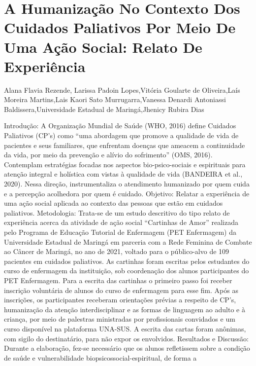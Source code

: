 
\section*{A Humanização No Contexto Dos Cuidados Paliativos Por Meio De Uma Ação Social: Relato De Experiência}

Alana Flavia Rezende, Larissa Padoin Lopes,Vitória Goularte de Oliveira,Laís Moreira Martins,Lais Kaori Sato Murrugarra,Vanessa Denardi Antoniassi Baldissera,Universidade Estadual de Maringá,Jhenicy Rubira Dias

Introdução: A Organização Mundial de Saúde (WHO, 2016) define Cuidados Paliativos (CP’s)
como “uma abordagem que promove a qualidade de vida de pacientes e seus familiares, que
enfrentam doenças que ameacem a continuidade da vida, por meio da prevenção e alívio do
sofrimento” (OMS, 2016). Contemplam estratégias focadas nos aspectos bio-psico-sociais e
espirituais para atenção integral e holística com vistas à qualidade de vida (BANDEIRA et al.,
2020). Nessa direção, instrumentaliza o atendimento humanizado por quem cuida e a percepção
acolhedora por quem é cuidado. Objetivo: Relatar a experiência de uma ação social aplicada ao
contexto das pessoas que estão em cuidados paliativos. Metodologia: Trata-se de um estudo
descritivo do tipo relato de experiência acerca da atividade de ação social “Cartinhas de Amor”
realizada pelo Programa de Educação Tutorial de Enfermagem (PET Enfermagem) da
Universidade Estadual de Maringá em parceria com a Rede Feminina de Combate ao Câncer de
Maringá, no ano de 2021, voltado para o público-alvo de 109 pacientes em cuidados paliativos.
As cartinhas foram escritas pelos estudantes do curso de enfermagem da instituição, sob
coordenação dos alunos participantes do PET Enfermagem. Para a escrita das cartinhas o
primeiro passo foi receber inscrição voluntária de alunos do curso de enfermagem para esse fim.
Após as inscrições, os participantes receberam orientações prévias a respeito de CP’s,
humanização da atenção interdisciplinar e as formas de linguagem ao adulto e à criança, por
meio de palestras ministradas por profissionais convidados e um curso disponível na plataforma
UNA-SUS. A escrita das cartas foram anônimas, com sigilo do destinatário, para não expor os
envolvidos. Resultados e Discussão: Durante a elaboração, fez-se necessário que os alunos
refletissem sobre a condição de saúde e vulnerabilidade biopsicossocial-espiritual, de forma a
